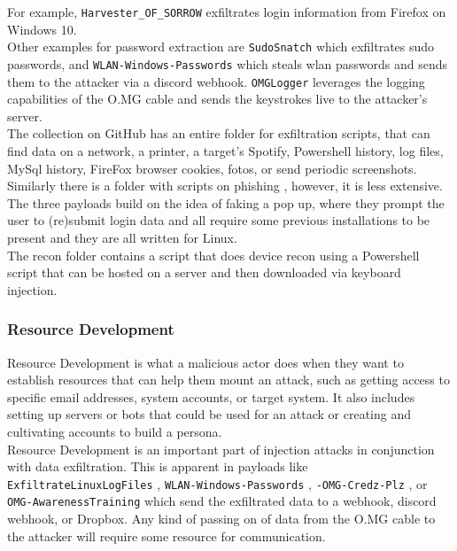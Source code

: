 For example, \verb|Harvester_OF_SORROW| \cite{OmgpayloadsPayloadsLibrary} exfiltrates login information from Firefox on Windows 10. \\ 
Other examples for password extraction are \verb|SudoSnatch| \cite{OmgpayloadsPayloadsLibrary} which exfiltrates sudo passwords, and \verb|WLAN-Windows-Passwords| \cite{OmgpayloadsPayloadsLibrary}which steals wlan passwords and sends them to the attacker via a discord webhook. 
\verb|OMGLogger| \cite{OmgpayloadsPayloadsLibrary} leverages the logging capabilities of the O.MG cable and sends the keystrokes live to the attacker's server. \\
The collection on GitHub has an entire folder for exfiltration scripts, that can find data on a network, a printer, a target's Spotify, Powershell history, log files, MySql history, FireFox browser cookies, fotos, or send periodic screenshots. \\
Similarly there is a folder with scripts on phishing  \cite{OmgpayloadsPayloadsLibrary}, however, it is less extensive. The three payloads build on the idea of faking a pop up, where they prompt the user to (re)submit login data and all require some previous installations to be present and they are all written for Linux. \\
The recon folder contains a script that does device recon using a Powershell script that can be hosted on a server and then downloaded via keyboard injection. 


\subsubsection{Resource Development}

Resource Development is what a malicious actor does when they want to establish resources that can help them mount an attack, such as getting access to specific email addresses, system accounts, or target system. It also includes setting up servers or bots that could be used for an attack or creating and cultivating accounts to build a persona.\cite{MITREATTCK}\\
Resource Development is an important part of injection attacks in conjunction with data exfiltration. This is apparent in payloads like \verb|ExfiltrateLinuxLogFiles| \cite{OmgpayloadsPayloadsLibrary}, \verb|WLAN-Windows-Passwords| \cite{OmgpayloadsPayloadsLibrary}, \verb|-OMG-Credz-Plz| \cite{OmgpayloadsPayloadsLibrary}, or \verb|OMG-AwarenessTraining| \cite{OmgpayloadsPayloadsLibrary} which send the exfiltrated data to a webhook, discord webhook, or Dropbox. Any kind of passing on of data from the O.MG cable to the attacker will require some resource for communication. 


